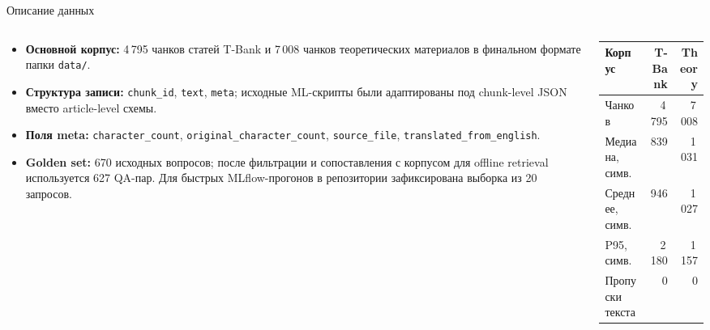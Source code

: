 \documentclass[aspectratio=169,11pt]{beamer}
\begin{document}
\begin{frame}{Описание данных}
  \small
  \begin{columns}[T]
    \begin{column}{0.56\textwidth}
      \begin{itemize}
        \item \textbf{Основной корпус:} 4\,795 чанков статей T-Bank и 7\,008 чанков теоретических материалов в финальном формате папки \texttt{data/}.
        \item \textbf{Структура записи:} \texttt{chunk\_id}, \texttt{text}, \texttt{meta}; исходные ML-скрипты были адаптированы под chunk-level JSON вместо article-level схемы.
        \item \textbf{Поля meta:} \texttt{character\_count}, \texttt{original\_character\_count}, \texttt{source\_file}, \texttt{translated\_from\_english}.
        \item \textbf{Golden set:} 670 исходных вопросов; после фильтрации и сопоставления с корпусом для offline retrieval используется 627 QA-пар. Для быстрых MLflow-прогонов в репозитории зафиксирована выборка из 20 запросов.
      \end{itemize}
    \end{column}
    \begin{column}{0.44\textwidth}
      \footnotesize
      \begin{tabular}{lrr}
        \toprule
        Корпус & T-Bank & Theory \\
        \midrule
        Чанков & 4\,795 & 7\,008 \\
        Медиана, симв. & 839 & 1\,031 \\
        Среднее, симв. & 946 & 1\,027 \\
        P95, симв. & 2\,180 & 1\,157 \\
        Пропуски текста & 0 & 0 \\
        \bottomrule
      \end{tabular}
    \end{column}
  \end{columns}
\end{frame}
\end{document}
